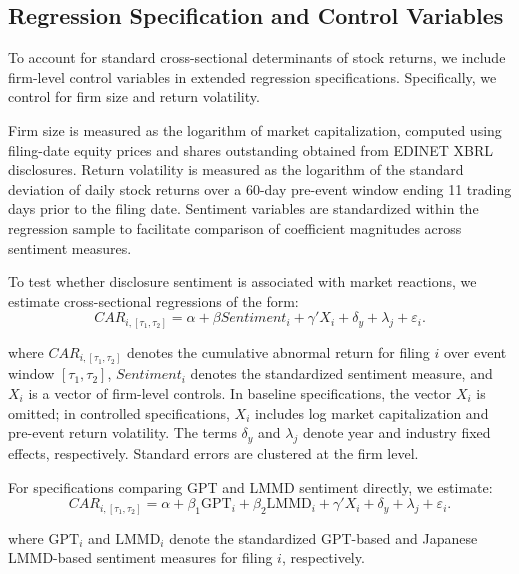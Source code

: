 \subsection{Regression Specification and Control Variables}
\label{subsec:regression_specification}

To account for standard cross-sectional determinants of stock returns, we include firm-level control variables in extended regression specifications. Specifically, we control for firm size and return volatility.

Firm size is measured as the logarithm of market capitalization, computed using filing-date equity prices and shares outstanding obtained from EDINET XBRL disclosures. Return volatility is measured as the logarithm of the standard deviation of daily stock returns over a 60-day pre-event window ending 11 trading days prior to the filing date. Sentiment variables are standardized within the regression sample to facilitate comparison of coefficient magnitudes across sentiment measures.

To test whether disclosure sentiment is associated with market reactions, we estimate cross-sectional regressions of the form:
\begin{equation}
CAR_{i,[\tau_1,\tau_2]} =
\alpha
+ \beta Sentiment_i
+ \gamma' X_i
+ \delta_y
+ \lambda_j
+ \varepsilon_i .
\end{equation}

where $CAR_{i,[\tau_1,\tau_2]}$ denotes the cumulative abnormal return for filing $i$ over event window $[\tau_1,\tau_2]$, $Sentiment_i$ denotes the standardized sentiment measure, and $X_i$ is a vector of firm-level controls. In baseline specifications, the vector $X_i$ is omitted; in controlled specifications, $X_i$ includes log market capitalization and pre-event return volatility. The terms $\delta_y$ and $\lambda_j$ denote year and industry fixed effects, respectively. Standard errors are clustered at the firm level.

For specifications comparing GPT and LMMD sentiment directly, we estimate:
\begin{equation}
CAR_{i,[\tau_1,\tau_2]} =
\alpha
+ \beta_1 \mathrm{GPT}_i
+ \beta_2 \mathrm{LMMD}_i
+ \gamma' X_i
+ \delta_y
+ \lambda_j
+ \varepsilon_i .
\end{equation}

where $\mathrm{GPT}_i$ and $\mathrm{LMMD}_i$ denote the standardized GPT-based and Japanese LMMD-based sentiment measures for filing $i$, respectively.